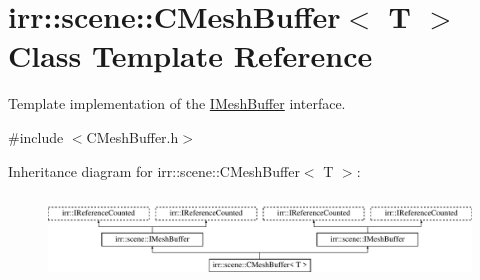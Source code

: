 \hypertarget{classirr_1_1scene_1_1CMeshBuffer}{}\section{irr\+:\+:scene\+:\+:C\+Mesh\+Buffer$<$ T $>$ Class Template Reference}
\label{classirr_1_1scene_1_1CMeshBuffer}


Template implementation of the \hyperlink{classirr_1_1scene_1_1IMeshBuffer}{I\+Mesh\+Buffer} interface.  




{\ttfamily \#include $<$C\+Mesh\+Buffer.\+h$>$}

Inheritance diagram for irr\+:\+:scene\+:\+:C\+Mesh\+Buffer$<$ T $>$\+:\begin{figure}[H]
\begin{center}
\leavevmode
\includegraphics[height=2.270270cm]{classirr_1_1scene_1_1CMeshBuffer}
\end{center}
\end{figure}
